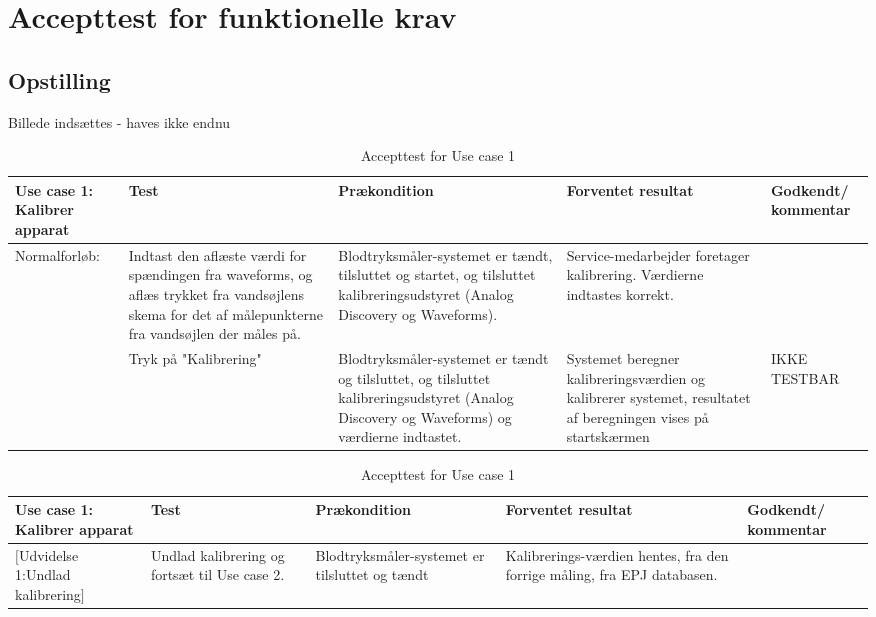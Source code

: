 \section{Accepttest for funktionelle krav}
\subsection{Opstilling}
Billede indsættes - haves ikke endnu
\\
\begin{table}[H]
\caption{Accepttest for Use case 1}\label{tab:tabel8}
\begin{tabular}{|>{\raggedright\arraybackslash}p{2.5cm}| >{\raggedright\arraybackslash}p{2.9cm} | >{\raggedright\arraybackslash}p{2.9cm} | >{\raggedright\arraybackslash}p{2.9cm} | >{\raggedright\arraybackslash}p{2.8cm} |}
   \hline
   \textbf{Use case 1: Kalibrer apparat} &\textbf{Test}& \textbf{Prækondition} & \textbf{Forventet resultat} & \textbf{Godkendt/ kommentar}\\ \hline
   Normalforløb: & Indtast den aflæste værdi for spændingen fra waveforms, og aflæs trykket fra vandsøjlens skema for det af målepunkterne fra vandsøjlen der måles på. & Blodtryksmåler-systemet er tændt, tilsluttet og startet, og tilsluttet kalibreringsudstyret (Analog Discovery og Waveforms). & Service-medarbejder foretager kalibrering. Værdierne indtastes korrekt. & \\\hline
   & Tryk på "Kalibrering" & Blodtryksmåler-systemet er tændt og tilsluttet, og tilsluttet kalibreringsudstyret (Analog Discovery og Waveforms) og værdierne indtastet. &
   Systemet beregner kalibreringsværdien og kalibrerer systemet, resultatet af beregningen vises på startskærmen & IKKE TESTBAR\\\hline
\end{tabular}
\end{table}


\begin{table}[H]
\caption{Accepttest for Use case 1}\label{tab:tabel8}
\begin{tabular}{|>{\raggedright\arraybackslash}p{2.5cm}| >{\raggedright\arraybackslash}p{2.9cm} | >{\raggedright\arraybackslash}p{2.9cm} | >{\raggedright\arraybackslash}p{2.9cm} | >{\raggedright\arraybackslash}p{2.8cm} |}
   \hline
   \textbf{Use case 1: Kalibrer apparat} &\textbf{Test}& \textbf{Prækondition} & \textbf{Forventet resultat} & \textbf{Godkendt/ kommentar}\\ \hline
   $[$Udvidelse 1:Undlad kalibrering$]$ & Undlad kalibrering og fortsæt til Use case 2. & Blodtryksmåler-systemet er tilsluttet og tændt & Kalibrerings-værdien hentes, fra den forrige måling, fra EPJ databasen. & \\\hline

\end{tabular}
\end{table}

